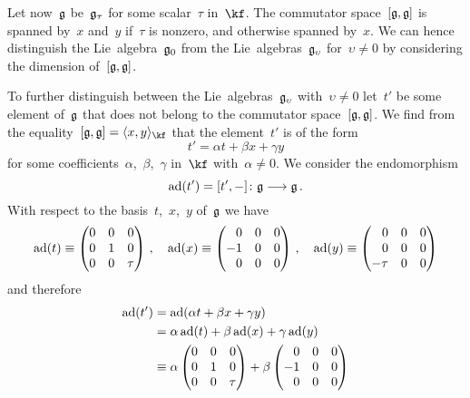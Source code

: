 \begin{example}
	Let now~$\mathfrak{g}$ be~$\mathfrak{g}_\tau$ for some scalar~$\tau$ in~$\kf$.
	The commutator space~$[\mathfrak{g}, \mathfrak{g}]$ is spanned by~$x$ and~$y$ if~$\tau$ is nonzero, and otherwise spanned by~$x$.
	We can hence distinguish the Lie~algebra~$\mathfrak{g}_0$ from the Lie~algebras~$\mathfrak{g}_\upsilon$ for~$\upsilon \neq 0$ by considering the dimension of~$[\mathfrak{g}, \mathfrak{g}]$.

	To further distinguish between the Lie~algebras~$\mathfrak{g}_\upsilon$ with~$\upsilon \neq 0$ let~$t'$ be some element of~$\mathfrak{g}$ that does not belong to the commutator space~$[\mathfrak{g}, \mathfrak{g}]$.
	We find from the equality~$[\glie, \glie] = \gen{x,y}_{\kf}$ that the element~$t'$ is of the form
	\[
		t'
		=
		\alpha t + \beta x + \gamma y
	\]
	for some coefficients~$\alpha$,~$\beta$,~$\gamma$ in~$\kf$ with~$\alpha \neq 0$.
	We consider the endomorphism
	\[
		\ad(t')
		=
		[t', \ph]
		\colon
		\glie
		\to
		\glie \,.
	\]
	With respect to the basis~$t$,~$x$,~$y$ of~$\mathfrak{g}$ we have
	\[
		\ad(t)
		\equiv
		\begin{pmatrix}
			0 & 0 & 0     \\
			0 & 1 & 0     \\
			0 & 0 & \tau
		\end{pmatrix} \,,
		\quad
		\ad(x)
		\equiv
		\begin{pmatrix*}[r]
			 0  & 0 & 0 \\
			-1  & 0 & 0 \\
			 0  & 0 & 0
		\end{pmatrix*} \,,
		\quad
		\ad(y)
		\equiv
		\begin{pmatrix*}[r]
			0     & 0 & 0 \\
			0     & 0 & 0 \\
			-\tau & 0 & 0
		\end{pmatrix*}
	\]
	and therefore
	\begin{align*}
		\ad(t')
		&=
		\ad(\alpha t + \beta x + \gamma y)
		\\
		&=
		\alpha \ad(t) + \beta \ad(x) + \gamma \ad(y)
		\\
		&\equiv
		\alpha
		\begin{pmatrix}
			0 & 0 & 0     \\
			0 & 1 & 0     \\
			0 & 0 & \tau
		\end{pmatrix}
		+
		\beta
		\begin{pmatrix*}[r]
			 0  & 0 & 0 \\
			-1  & 0 & 0 \\
			 0  & 0 & 0
		\end{pmatrix*}

\end{align*}
\end{example}
